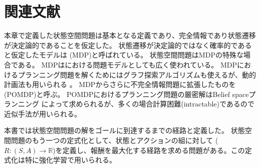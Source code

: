 \section{関連文献}

本章で定義した状態空間問題は基本となる定義であり、完全情報であり状態遷移が決定論的であることを仮定した。
状態遷移が決定論的ではなく確率的であると仮定したモデルは (MDP)と呼ばれている。
状態空間問題はMDPの特殊な場合である。
MDPはにおける問題モデルとしても広く使われている。
MDPにおけるプランニング問題を解くためにはグラフ探索アルゴリズムも使えるが、動的計画法も用いられる \cite{puterman2014markov}。
MDPからさらに不完全情報問題に拡張したものを (POMDP)と呼ぶ。
POMDPにおけるプランニング問題の厳密解はBelief spaceプランニング \cite{kaelbling1998planning}によって求められるが、多くの場合計算困難(intractable)であるので近似手法が用いられる。


本書では状態空間問題の解をゴールに到達するまでの経路と定義した。
状態空間問題のもう一つの定式化として、状態とアクションの組に対して ($R: (S, A) \rightarrow \mathbb{R}$)を定義し、報酬を最大化する経路を求める問題がある。この定式化は特に強化学習で用いられる。




